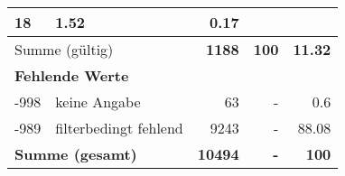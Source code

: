 \begin{longtable}{lXrrr}
       \num{18} &
       \num[round-mode=places,round-precision=2]{1,52} &
         \num[round-mode=places,round-precision=2]{0,17} \\
     \midrule
     \multicolumn{2}{l}{Summe (gültig)} &
       \textbf{\num{1188}} &
     \textbf{100} &
       \textbf{\num[round-mode=places,round-precision=2]{11,32}} \\
     \multicolumn{5}{l}{\textbf{Fehlende Werte}}\\
       -998 &
       keine Angabe &
         \num{63} &
        - &
         \num[round-mode=places,round-precision=2]{0,6} \\
       -989 &
       filterbedingt fehlend &
         \num{9243} &
        - &
         \num[round-mode=places,round-precision=2]{88,08} \\
     \midrule
     \multicolumn{2}{l}{\textbf{Summe (gesamt)}} &
          \textbf{\num{10494}} &
        \textbf{-} &
        \textbf{100} \\
     \bottomrule
     \end{longtable}
     
